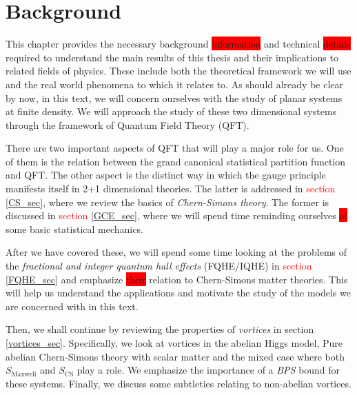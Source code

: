 
    \graphicspath{{Background_Folder/figures/PNG/}{Background_Folder/figures/PDF/}{Background_Folder/figures/}}

\chapter{Background}
This chapter provides the necessary background \colorbox{red}{information} and technical \colorbox{red}{details} required to understand the main results of this thesis and their implications to related fields of physics. These include both the theoretical framework we will use and the real world phenomena to which it relates to. As should already be clear by now, in this text, we will concern ourselves with the study of planar systems at finite density. We will approach the study of these two dimensional systems through the framework of Quantum Field Theory (QFT). 

    There are two important aspects of QFT that will play a major role for us. One of them is the relation between the grand canonical statistical partition function and QFT. The other aspect is the distinct way in which the gauge principle manifests itself in 2+1 dimensional theories. The latter is addressed in \textcolor{red}{section} \ref{CS_sec}, where we review the basics of \textit{Chern-Simons theory}. The former is discussed in \textcolor{red}{section} \ref{GCE_sec}, where we will spend time reminding ourselves \colorbox{red}{of} some basic statistical mechanics. 


    After we have covered these, \colorbox{red}{ }we will spend some time looking at the problems of the \textit{fractional and integer quantum hall effects} (FQHE/IQHE) in \textcolor{red}{section} \ref{FQHE_sec} and emphasize \colorbox{red}{their} relation to Chern-Simons matter theories. This will help us understand the applications and motivate the study of the models we are concerned with in this text.

    Then, we shall continue by reviewing the properties of \textit{vortices} in section \ref{vortices_sec}. Specifically, we look at vortices in the abelian Higgs model, Pure abelian Chern-Simons theory with scalar matter and the mixed case where both $S_{\text{Maxwell}}$ and $S_{\text{CS}}$ play a role. We emphasize the importance of a \textit{BPS} bound for these systems. Finally, we discuss some subtleties relating to non-abelian vortices.

